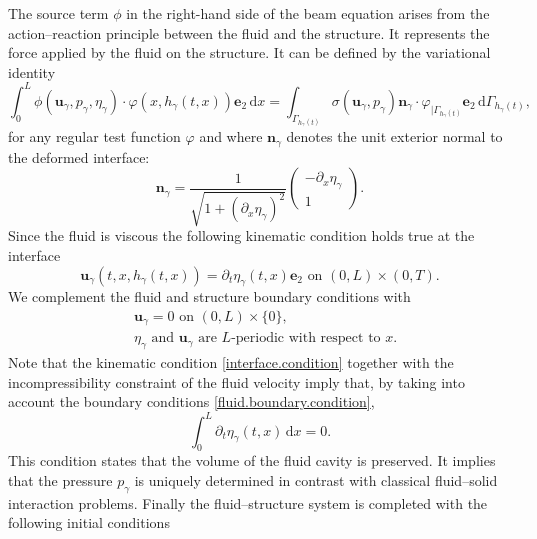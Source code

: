 \documentclass[11pt]{article}
\theoremstyle{remark}
\theoremstyle{definition}
\newcommand{\ug}{\boldsymbol{u}}
\newcommand{\dd}{\,\mathrm{d}}
\newcommand{\normal}{\BS{n}}
\newcommand{\BS}[1]{\boldsymbol{#1}}
\begin{document}
The source term $\phi$ in the right-hand side of the beam equation arises from the action--reaction principle between the fluid and the structure. It represents the force applied by the fluid on the structure. It can be defined by the variational identity
\begin{equation}
\label{def:forcefluide}
\int_{0}^{L}\phi(\ug_{\gamma},p_{\gamma},\eta_{\gamma})\cdot \varphi(x,h_{\gamma}(t,x))\BS{e}_{2}\dd x=\int_{\Gamma_{h_{\gamma}(t)}}\sigma(\ug_{\gamma},p_{\gamma})\normal_{\gamma}\cdot \varphi_{\vert \Gamma_{h_{\gamma}(t)}}\BS{e}_{2}\dd \Gamma_{h_{\gamma}(t)},
\end{equation}
for any regular test function $\varphi$ and where $\normal_{\gamma}$ denotes the unit exterior normal to the deformed interface:\vspace*{-3pt}
\[
\normal_{\gamma}=\frac{1}{\sqrt{1+(\partial_{x}\eta_{\gamma})^{2}}}\begin{pmatrix}
-\partial_{x}\eta_{\gamma}\\
1
\end{pmatrix}.
\]
Since the fluid is viscous the following kinematic condition holds true at the interface%
\begin{equation}\label{interface.condition}
\ug_{\gamma}(t,x,h_\gamma(t,x))=\partial_{t}\eta_{\gamma}(t,x)\BS{e}_{2}\text{ on } (0, L)\times (0, T).
\end{equation}
We complement the fluid and structure boundary conditions with
\begin{equation}\label{fluid.boundary.condition}
\begin{aligned}
&\ug_{\gamma}=0\text{ on }(0,L)\times \{0\},\\
&\eta_{\gamma}\text{ and }\ug_{\gamma}\text{ are }L\text{-periodic with respect to }x.
\end{aligned}
\end{equation}
Note that the kinematic condition \eqref{interface.condition} together with the incompressibility constraint of the fluid velocity imply that, by taking into account the boundary conditions \eqref{fluid.boundary.condition},%
\begin{equation}\label{compatibilite-vitesse-structure}
\int_0^L\partial_t \eta_\gamma(t,x) \dd x =0.
\end{equation}
This condition states that the volume of the fluid cavity is preserved.
It implies that the pressure $p_{\gamma}$ is uniquely determined in contrast with classical fluid--solid interaction problems.
Finally the fluid--structure system is completed with the following initial conditions
\end{document}
